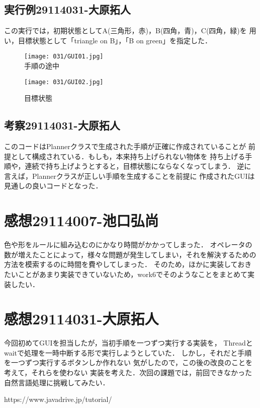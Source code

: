 \documentclass{jarticle}
\begin{document}
\subsection{実行例29114031-大原拓人}
    この実行では，初期状態としてA(三角形，赤)，B(四角，青)，C(四角，緑)を
    用い，目標状態として「triangle on B」，「B on green」を指定した．
\begin{figure}[H]
    \centering
    \texttt{[image: 031/GUI01.jpg]}\\
    \caption{手順の途中}
    \texttt{[image: 031/GUI02.jpg]}
    \caption{目標状態}
\end{figure}
\subsection{考察29114031-大原拓人}
    このコードはPlannerクラスで生成された手順が正確に作成されていることが
    前提として構成されている．もしも，本来持ち上げられない物体を
    持ち上げる手順や，連続で持ち上げようとすると，目標状態にならなくなってしまう．
    逆に言えば，Plannerクラスが正しい手順を生成することを前提に
    作成されたGUIは見通しの良いコードとなった．


\section{感想29114007-池口弘尚}
色や形をルールに組み込むのにかなり時間がかかってしまった．
オペレータの数が増えたことによって，様々な問題が発生してしまい，それを解決するための方法を模索するのに時間を費やしてしまった．
そのため，ほかに実装しておきたいことがあまり実装できていないため，work6でそのようなことをまとめて実装したい．

\section{感想29114031-大原拓人}
    今回初めてGUIを担当したが，当初手順を一つずつ実行する実装を，
    Threadとwaitで処理を一時中断する形で実行しようとしていた．
    しかし，それだと手順を一つずつ実行するボタンしか作れない
    気がしたので，この後の改良のことを考えて，それらを使わない
    実装を考えた．次回の課題では，前回できなかった自然言語処理に挑戦してみたい．

\begin{thebibliography}{99}
     https://www.javadrive.jp/tutorial/
\end{thebibliography}
\end{document}
